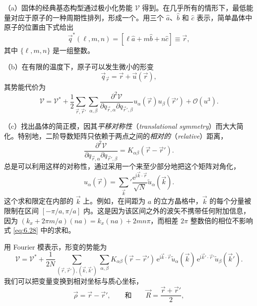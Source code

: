 （a）固体的经典基态构型通过极小化势能 $\mathcal V$ 得到。在几乎所有的情形下，最低能量对应于原子的一种周期性排列，形成一个。用三个 $\hat a$、$\hat b$ 和 $\hat c$ 表示，简单晶体中原子的位置由下式给出
\begin{equation}\label{eq:6.24}
\vec q^*(\ell,m,n)=\left[\ell\hat a+m\hat b+n\hat c\right]\equiv\vec r,
\end{equation}
其中 $\{\ell,m,n\}$ 是一组整数。


（b）在有限的温度下，原子可以发生微小的形变
\begin{equation}\label{eq:6.25}
\vec q_{\vec r}=\vec r+\vec u(\vec r),
\end{equation}
其势能代价为
\begin{equation}\label{eq:6.26}
\mathcal V=\mathcal V^*+\frac12\sum_{\vec r,\vec r'}\sum_{\alpha,\beta}\frac{\partial^2\mathcal V}{\partial q_{\vec r,\alpha}\partial q_{\vec r',\beta}}u_\alpha(\vec r)u_\beta(\vec r')+\mathcal O(u^3).
\end{equation}

（c）找出晶体的简正模，因其\emph{平移对称性}（\textit{translational symmetry}）而大大简化。特别地，二阶导数矩阵只依赖于两点之间的\emph{相对的}（\textit{relative}）距离，
\begin{equation}\label{eq:6.27}
\frac{\partial^2\mathcal V}{\partial q_{\vec r,\alpha}\partial q_{\vec r',\beta}}=K_{\alpha\beta}(\vec r-\vec r').
\end{equation}
总是可以利用这样的对称性，通过采用一个来至少部分地把这个矩阵对角化，
\begin{equation}\label{eq:6.28}
u_\alpha(\vec r)=\sum_{\vec k}{}'\frac{\mathrm e^{\mathrm i\vec k\cdot\vec r}}{\sqrt N}\tilde u_\alpha(\vec k).
\end{equation}
这个求和限定在内部的 $\vec k$ 上。例如，在间距为 $a$ 的立方晶格中，$\vec k$ 的每个分量被限制在区间 $[-\pi/a,\pi/a]$ 内。这是因为该区间之外的波矢不携带任何附加信息，因为 $(k_x+2\pi m/a)(na)=k_x(na)+2mn\pi$，而相差 $2\pi$ 整数倍的相位不影响式 \eqref{eq:6.28} 中的求和。


用 Fourier 模表示，形变的势能为
\begin{equation}\label{eq:6.29}
\mathcal V=\mathcal V^*+\frac1{2N}\sum_{(\vec r,\vec r'),(\vec k,\vec k')}\sum_{\alpha,\beta}K_{\alpha\beta}(\vec r-\vec r')\,\mathrm e^{\mathrm i\vec k\cdot\vec r}\tilde u_\alpha(\vec k)\,\mathrm e^{\mathrm i\vec k'\cdot\vec r'}\tilde u_\beta(\vec k').
\end{equation}
我们可以把变量变换到相对坐标与质心坐标，
\begin{equation*}
\vec\rho=\vec r-\vec r',\qquad\text{和}\qquad\vec R=\frac{\vec r+\vec r'}2,
\end{equation*}

